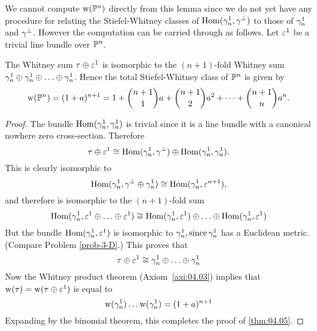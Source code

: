 \documentclass[../main]{subfiles}
\begin{document}
We cannot compute $\operatorname{w}(\mathbb{P}^n)$ directly from this lemma since we do not yet have any procedure for relating the Stiefel-Whitney classes of $\operatorname{Hom}(\gamma_n^1, \gamma^{\perp})$ to those of $\gamma_n^1$ and $\gamma^{\perp}$. However the computation can be carried through as follows. Let $\varepsilon^1$ be a trivial line bundle over $\mathbb{P}^{n}$.

\begin{theorem}
\label{thm:04.05}
The Whitney sum $\tau \oplus \varepsilon^{1}$ is isomorphic to the $(n+1)$-fold Whitney sum $\gamma_{n}^{1} \oplus \gamma_{n}^{1} \oplus \ldots \oplus \gamma_{n}^{1}$. Hence the total Stiefel-Whitney class of $\mathbb{P}^{n}$ is given by
\[
\operatorname{w}(\mathbb{P}^{n})=(1+a)^{n+1}=1+\binom{n+1}{1}a + \binom{n+1}{2}a^2 + \dots + \binom{n+1}{n}a^{n} .
\]
\end{theorem}

\begin{proof}
The bundle $\operatorname{Hom}(\gamma_{n}^{1}, \gamma_{n}^{1})$  is trivial since it is a line bundle with a canonical nowhere zero cross-section. Therefore
\[
\tau \oplus \varepsilon^{1} \cong \operatorname{Hom}(\gamma_{n}^{1}, \gamma^{\perp}) \oplus \operatorname{Hom}(\gamma_{n}^{1}, \gamma_{n}^{1}) .
\]
This is clearly isomorphic to
\[
\operatorname{Hom}(\gamma_{n}^{1}, \gamma^{\perp} \oplus \gamma_{n}^{1}) \cong \operatorname{Hom}(\gamma_{n}^{1}, \varepsilon^{n+1}),
\]
and therefore is isomorphic to the $(n+1)$-fold sum
\[
\operatorname{Hom}(\gamma_{n}^{1}, \varepsilon^{1} \oplus \ldots \oplus \varepsilon^{1}) \cong \operatorname{Hom}(\gamma_{n}^{1}, \varepsilon^{1}) \oplus \ldots \oplus \operatorname{Hom}(\gamma_{n}^{1}, \varepsilon^{1})
\]
But the bundle $\operatorname{Hom}(\gamma_{n}^{1}, \varepsilon^{1})$ is isomorphic to $\gamma_{n}^{1}, \operatorname{since} \gamma_{n}^{1}$ has a Euclidean metric. (Compare Problem \ref{prob-3-D}.) This proves that
\[
\tau \oplus \varepsilon^{1} \cong \gamma_{n}^{1} \oplus \ldots \oplus \gamma_{n}^{1}
\]
Now the Whitney product theorem (Axiom~\ref{axi:04.03}) implies that $\operatorname{w}(\tau)=\operatorname{w}(\tau \oplus \varepsilon^{1})$ is equal to
\[
\operatorname{w}(\gamma_{n}^{1}) \ldots \operatorname{w}(\gamma_{n}^{1})=(1+a)^{n+1}
\]
Expanding by the binomial theorem, this completes the proof of \ref{thm:04.05}.

\end{proof}
\end{document}
